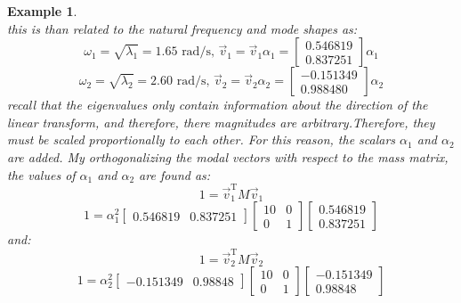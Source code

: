 \documentclass[12pt,letter]{article}
\newtheorem{ex}{Example}
\numberwithin{ex}{section} %
\newenvironment{example}{\begin{mdframed}[middlelinewidth=0.5mm]\begin{ex}\normalfont}{\end{ex}\end{mdframed}}
\numberwithin{re}{section} %
\begin{document}
\begin{example}
\begin{equation}
\end{equation}
this is than related to the natural frequency and mode shapes as:
\begin{equation}
\omega_1 = \sqrt{\lambda_1} = 1.65 \text{ rad/s, } \vec{v}_1 = \vec{v}_1 \alpha_1 = \begin{bmatrix} 0.546819 \\  0.837251 \end{bmatrix} \alpha_1
\end{equation}
\begin{equation}
\omega_2 = \sqrt{\lambda_2} = 2.60 \text{ rad/s, } \vec{v}_2 = \vec{v}_2 \alpha_2 = \begin{bmatrix} -0.151349 \\  0.988480 \end{bmatrix} \alpha_2 
\end{equation}
recall that the eigenvalues only contain information about the direction of the linear transform, and therefore, there magnitudes are arbitrary.Therefore, they must be scaled proportionally to each other. For this reason, the scalars $\alpha_1$ and $\alpha_2$ are added. My orthogonalizing the modal vectors with respect to the mass matrix, the values of $\alpha_1$ and $\alpha_2$ are found as:
\begin{equation}
1 = \vec{v}_1^\text{T} M \vec{v}_1 
\end{equation}
\begin{equation}
1 = \alpha_1^2 \begin{bmatrix} 0.546819 &  0.837251 \end{bmatrix} \begin{bmatrix} 10 & 0 \\    0  & 1 \end{bmatrix}  \begin{bmatrix} 0.546819 \\  0.837251 \end{bmatrix}
\end{equation}
and:
\begin{equation}
1 = \vec{v}_2^\text{T} M \vec{v}_2 
\end{equation}
\begin{equation}
1 = \alpha_2^2 \begin{bmatrix} -0.151349 &  0.98848 \end{bmatrix} \begin{bmatrix} 10 & 0 \\    0  & 1 \end{bmatrix}  \begin{bmatrix} -0.151349 \\  0.98848 \end{bmatrix}

\end{equation}
\end{example}
\end{document}
